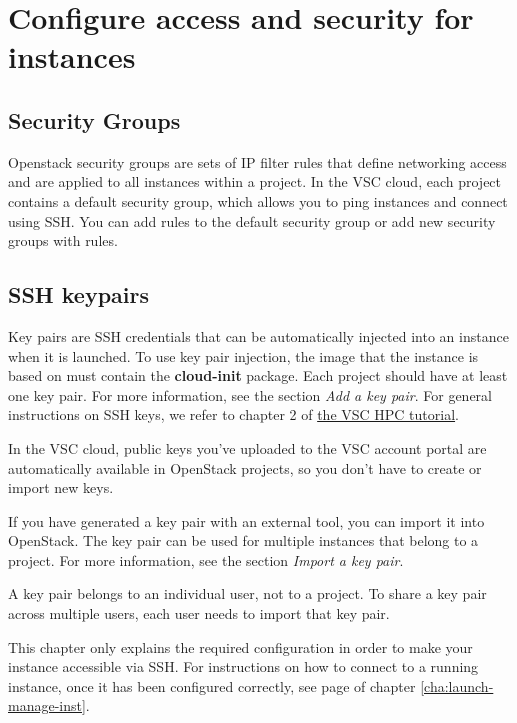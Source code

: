 \chapter{Configure access and security for instances}\label{cha:conf-access-secur}

\section{Security Groups}
Openstack security groups are sets of IP filter rules that define
networking access and are applied to all instances within a project.
In the VSC cloud, each project contains a default security group,
which allows you to ping instances and connect using SSH.  You can add
rules to the default security group or add new security groups with
rules.

\section{SSH keypairs}
Key pairs are SSH credentials that can be automatically injected into
an instance when it is launched. To use key pair injection, the image
that the instance is based on must contain the \textbf{cloud-init}
package. Each project should have at least one key pair. For more
information, see the section \emph{Add a key pair}.  For general
instructions on SSH keys, we refer to chapter 2 of
\href{https://www.vscentrum.be/support/tut-book/vsc-tutorials}{the VSC
  HPC tutorial}.

 In the VSC cloud, public keys you've uploaded to the
VSC account portal are automatically available in OpenStack projects,
so you don't have to create or import new keys.

If you have generated a key pair with an external tool, you can import
it into \gls{OpenStack}. The key pair can be used for multiple
instances that belong to a project. For more information, see the
section \emph{Import a key pair}.

 A key pair belongs to an individual user, not to a
project. To share a key pair across multiple users, each user needs to
import that key pair.

 This chapter only explains the required configuration
in order to make your instance accessible via SSH.  For instructions
on how to connect to a running instance, once it has been configured
correctly, see page \pageref{connect-to-your-instance-using-ssh} of
chapter \ref{cha:launch-manage-inst}.

